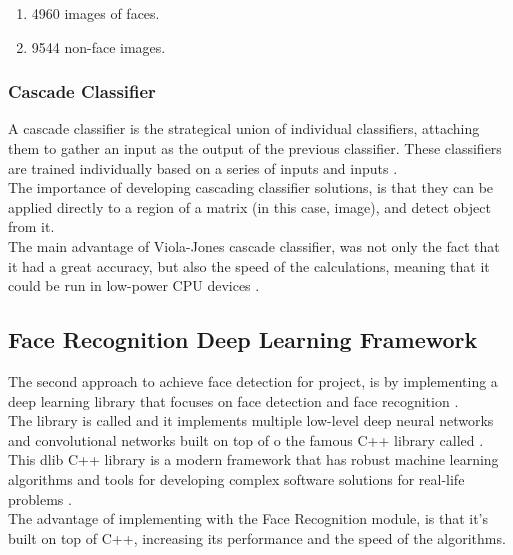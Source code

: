 \documentclass[11pt]{report} %
\begin{document}
\begin{enumerate}
    \item 4960 images of faces.
    \item 9544 non-face images.
\end{enumerate}


\subsubsection{Cascade Classifier}

A cascade classifier is the strategical union of individual classifiers, attaching them to gather an input as the output of the previous classifier.
These classifiers are trained individually based on a series of  inputs and  inputs \citep{cite_cascade_classifier_generalization}.\\

The importance of developing cascading classifier solutions, is that they can be applied directly to a region of a matrix (in this case, image), and detect object from it.\\

The main advantage of Viola-Jones cascade classifier, was not only the fact that it had a great accuracy, but also the speed of the calculations, meaning that it could be run in low-power CPU devices \citep{cite_viola_jones_face_detection_algorithm}.\\



\subsection{Face Recognition Deep Learning Framework}

The second approach to achieve face detection for  project, is by implementing a deep learning library that focuses on face detection and face recognition \citep{cite_face_detect_face_recognition_github_repo}.\\

The library is called  and it implements multiple low-level deep neural networks and convolutional networks built on top of o the famous C++ library called . This dlib C++ library is a modern framework that has robust machine learning algorithms and tools for developing complex software solutions for real-life problems \citep{cite_dlib_github_repo}.\\

The advantage of implementing  with the Face Recognition module, is that it's built on top of C++, increasing its performance and the speed of the algorithms.\\
\end{document}
